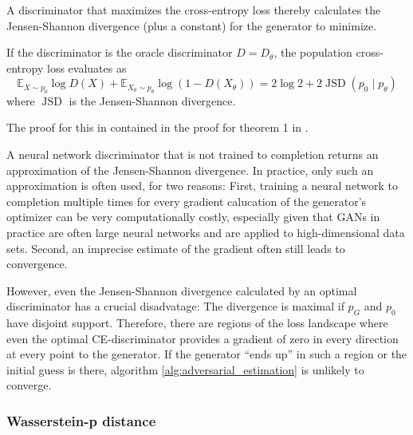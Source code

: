 A discriminator that maximizes the cross-entropy loss thereby calculates the Jensen-Shannon divergence (plus a constant) for the generator to minimize.
\begin{theorem} \label{thm:global-optimality}
    If the discriminator is the oracle discriminator $D=D_\theta$, the population cross-entropy loss evaluates as
    \begin{equation}
        \mathbb E_{X\sim p_0} \log D(X)+\mathbb E_{X_\theta\sim p_\theta} \log (1-D(X_\theta))
        = 2\log 2 + 2 \operatorname{JSD}(p_0 \mid p_\theta)
    \end{equation}
    where $\operatorname{JSD}$ is the Jensen-Shannon divergence.
\end{theorem}

The proof for this in contained in the proof for theorem 1 in \textcite{goodfellow2014generative}.

A neural network discriminator that is not trained to completion returns an approximation of the Jensen-Shannon divergence.
In practice, only such an approximation is often used, for two reasons:
First, training a neural network to completion multiple times for every gradient calucation of the generator's optimizer can be very computationally costly, %
especially given that GANs in practice are often large neural networks and are applied to high-dimensional data sets.
Second, an imprecise estimate of the gradient often still leads to convergence. %

However, even the Jensen-Shannon divergence calculated by an optimal discriminator has a crucial disadvatage:
The divergence is maximal if $p_G$ and $p_0$ have disjoint support. %
Therefore, there are regions of the loss landscape where even the optimal CE-discriminator provides a gradient of zero in every direction at every point to the generator.
If the generator ``ends up'' in such a region or the initial guess is there, algorithm \ref{alg:adversarial_estimation} is unlikely to converge.

\subsubsection{Wasserstein-p distance}
\label{sec:wasserstein_loss}

